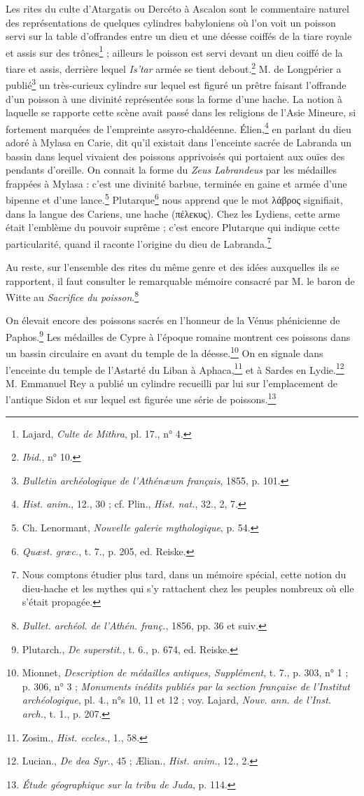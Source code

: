 \documentclass[a4paper, 11pt, oneside, landscape]{article}
\begin{document}
Les rites du culte d'Atargatis ou Dercéto à Ascalon sont le commentaire naturel des représentations de quelques cylindres babyloniens où l'on voit un poisson servi sur la table d'offrandes entre un dieu et une déesse coiffés de la tiare royale et assis sur des trônes\footnote{Lajard, \emph{Culte de Mithra}, pl. 17., n° 4.} ; ailleurs le poisson est servi devant un dieu coiffé de la tiare et assis, derrière lequel \emph{Is'tar} armée se tient debout.\footnote{\emph{Ibid.}, n° 10.} M. de Longpérier a publié\footnote{\emph{Bulletin archéologique de l'Athénæum français}, 1855, p. 101.} un très-curieux cylindre sur lequel est figuré un prêtre faisant l'offrande d'un poisson à une divinité représentée sous la forme d'une hache. La notion à laquelle se rapporte cette scène avait passé dans les religions de l'Asie Mineure, si fortement marquées de l'empreinte assyro-chaldéenne. Élien,\footnote{\emph{Hist. anim.}, 12., 30 ; cf. Plin., \emph{Hist. nat.}, 32., 2, 7.} en parlant du dieu adoré à Mylasa en Carie, dit qu'il existait dans l'enceinte sacrée de Labranda un bassin dans lequel vivaient des poissons apprivoisés qui portaient aux ouïes des pendants d'oreille. On connait la forme du \emph{Zeus Labrandeus} par les médailles frappées à Mylasa : c'est une divinité barbue, terminée en gaine et armée d'une bipenne et d'une lance.\footnote{Ch. Lenormant, \emph{Nouvelle galerie mythologique}, p. 54.} Plutarque\footnote{\emph{Quæst. græc.}, t. 7., p. 205, ed. Reiske.} nous apprend que le mot λάβρος signifiait, dans la langue des Cariens, une hache (πέλεκυς). Chez les Lydiens, cette arme était l'emblème du pouvoir suprême ; c'est encore Plutarque qui indique cette particularité, quand il raconte l'origine du dieu de Labranda.\footnote{Nous comptons étudier plus tard, dans un mémoire spécial, cette notion du dieu-hache et les mythes qui s'y rattachent chez les peuples nombreux où elle s'était propagée.}

Au reste, sur l'ensemble des rites du même genre et des idées auxquelles ils se rapportent, il faut consulter le remarquable mémoire consacré par M. le baron de Witte au \emph{Sacrifice du poisson}.\footnote{\emph{Bullet. archéol. de l'Athén. franç.}, 1856, pp. 36 et suiv.}

On élevait encore des poissons sacrés en l'honneur de la Vénus phénicienne de Paphos.\footnote{Plutarch., \emph{De superstit.}, t. 6., p. 674, ed. Reiske.} Les médailles de Cypre à l'époque romaine montrent ces poissons dans un bassin circulaire en avant du temple de la déesse.\footnote{Mionnet, \emph{Description de médailles antiques, Supplément}, t. 7., p. 303, n° 1 ; p. 306, n° 3 ; \emph{Monuments inédits publiés par la section française de l'Institut archéologique}, pl. 4., n°s 10, 11 et 12 ; voy. Lajard, \emph{Nouv. ann. de l'Inst. arch.}, t. 1., p. 207.} On en signale dans l'enceinte du temple de l'Astarté du Liban à Aphaca,\footnote{Zosim., \emph{Hist. eccles.}, 1., 58.} et à Sardes en Lydie.\footnote{Lucian., \emph{De dea Syr.}, 45 ; Ælian., \emph{Hist. anim.}, 12., 2.} M. Emmanuel Rey a publié un cylindre recueilli par lui sur l'emplacement de l'antique Sidon et sur lequel est figurée une série de poissons.\footnote{\emph{Étude géographique sur la tribu de Juda}, p. 114.}
\end{document}
